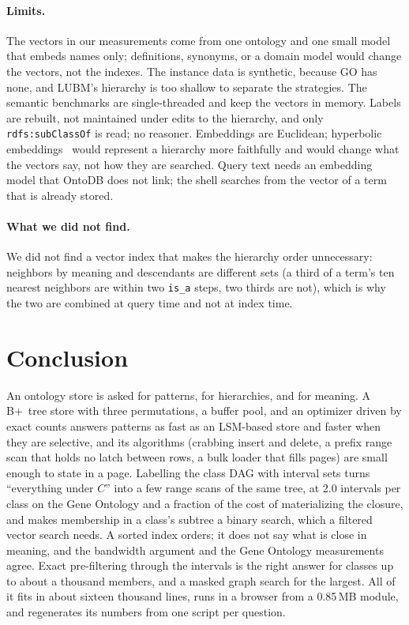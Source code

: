 \documentclass[sigconf, nonacm]{acmart}
\newcommand{\sys}{OntoDB}
\newcommand{\code}[1]{\texttt{#1}}
\begin{document}
\paragraph{Limits.} The vectors in our measurements come from one ontology and one small model that embeds names only; definitions, synonyms, or a domain model would change the vectors, not the indexes. The instance data is synthetic, because GO has none, and LUBM's hierarchy is too shallow to separate the strategies. The semantic benchmarks are single-threaded and keep the vectors in memory. Labels are rebuilt, not maintained under edits to the hierarchy, and only \code{rdfs:subClassOf} is read; no reasoner. Embeddings are Euclidean; hyperbolic embeddings~\cite{nickel2017} would represent a hierarchy more faithfully and would change what the vectors say, not how they are searched. Query text needs an embedding model that \sys{} does not link; the shell searches from the vector of a term that is already stored.

\paragraph{What we did not find.} We did not find a vector index that makes the hierarchy order unnecessary: neighbors by meaning and descendants are different sets (a third of a term's ten nearest neighbors are within two \code{is\_a} steps, two thirds are not), which is why the two are combined at query time and not at index time.


\section{Conclusion}

An ontology store is asked for patterns, for hierarchies, and for meaning. A B+~tree store with three permutations, a buffer pool, and an optimizer driven by exact counts answers patterns as fast as an LSM-based store and faster when they are selective, and its algorithms (crabbing insert and delete, a prefix range scan that holds no latch between rows, a bulk loader that fills pages) are small enough to state in a page. Labelling the class DAG with interval sets turns ``everything under $C$'' into a few range scans of the same tree, at 2.0 intervals per class on the Gene Ontology and a fraction of the cost of materializing the closure, and makes membership in a class's subtree a binary search, which a filtered vector search needs. A sorted index orders; it does not say what is close in meaning, and the bandwidth argument and the Gene Ontology measurements agree. Exact pre-filtering through the intervals is the right answer for classes up to about a thousand members, and a masked graph search for the largest. All of it fits in about sixteen thousand lines, runs in a browser from a 0.85\,MB module, and regenerates its numbers from one script per question.




\end{document}
